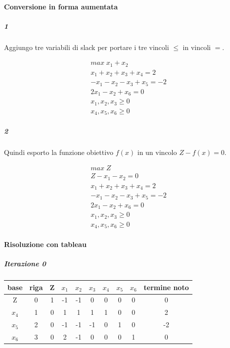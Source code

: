 \documentclass[a4paper,12pt,oneside]{article}
\begin{document}
    \paragraph{Conversione in forma aumentata}

    \subparagraph{1}

    Aggiungo tre variabili di slack per portare i tre vincoli $\leq$ in vincoli $=$.

    \begin{align}
        \text{$max \; x_1 + x_2$} \\
        \text{$x_1 + x_2 + x_3 + x_4 = 2$} \\
        \text{$- x_1 - x_2 - x_3 + x_5 = - 2$} \\
        \text{$2 x_1 - x_2 + x_6 = 0$} \\
        \text{$x_1, x_2, x_3 \geq 0$} \\
        \text{$x_4, x_5, x_6 \geq 0$}
    \end{align}

    \subparagraph{2}

    Quindi esporto la funzione obiettivo $f(x)$ in un vincolo $Z - f(x) = 0$.

    \begin{align}
        \text{$max \; Z$} \\
        \text{$Z - x_1 - x_2 = 0$} \\
        \text{$x_1 + x_2 + x_3 + x_4 = 2$} \\
        \text{$- x_1 - x_2 - x_3 + x_5 = - 2$} \\
        \text{$2 x_1 - x_2 + x_6 = 0$} \\
        \text{$x_1, x_2, x_3 \geq 0$} \\
        \text{$x_4, x_5, x_6 \geq 0$}
    \end{align}

    \paragraph{Risoluzione con tableau}

    \subparagraph{Iterazione 0}

    \begin{center}
        \begin{tabular}{|c|c|c|c|c|c|c|c|c|c|}
            \hline
            base & riga & Z & $x_1$ & $x_2$ & $x_3$ & $x_4$ & $x_5$ & $x_6$ & termine noto \\
            \hline
            Z & 0 & 1 & -1 & -1 &  0 &  0 &  0 &  0 &  0 \\
            $x_4$ & 1 & 0 &  1 &  1 &  1 &  1 &  0 &  0 &  2 \\
            $x_5$ & 2 & 0 & -1 & -1 & -1 &  0 &  1 &  0 & -2 \\
            $x_6$ & 3 & 0 &  2 & -1 &  0 &  0 &  0 &  1 &  0 \\
            \hline
        \end{tabular}
    \end{center}
\end{document}
